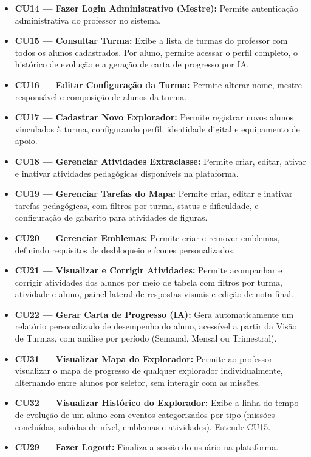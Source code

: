 \documentclass[12pt, a4paper]{article}
\begin{document}
\begin{itemize}
    \item \textbf{CU14 --- Fazer Login Administrativo (Mestre):} Permite autenticação administrativa do professor no sistema.

    \item \textbf{CU15 --- Consultar Turma:} Exibe a lista de turmas do professor com todos os alunos cadastrados. Por aluno, permite acessar o perfil completo, o histórico de evolução e a geração de carta de progresso por IA.

    \item \textbf{CU16 --- Editar Configuração da Turma:} Permite alterar nome, mestre responsável e composição de alunos da turma.

    \item \textbf{CU17 --- Cadastrar Novo Explorador:} Permite registrar novos alunos vinculados à turma, configurando perfil, identidade digital e equipamento de apoio.

    \item \textbf{CU18 --- Gerenciar Atividades Extraclasse:} Permite criar, editar, ativar e inativar atividades pedagógicas disponíveis na plataforma.

    \item \textbf{CU19 --- Gerenciar Tarefas do Mapa:} Permite criar, editar e inativar tarefas pedagógicas, com filtros por turma, status e dificuldade, e configuração de gabarito para atividades de figuras.

    \item \textbf{CU20 --- Gerenciar Emblemas:} Permite criar e remover emblemas, definindo requisitos de desbloqueio e ícones personalizados.

    \item \textbf{CU21 --- Visualizar e Corrigir Atividades:} Permite acompanhar e corrigir atividades dos alunos por meio de tabela com filtros por turma, atividade e aluno, painel lateral de respostas visuais e edição de nota final.

    \item \textbf{CU22 --- Gerar Carta de Progresso (IA):} Gera automaticamente um relatório personalizado de desempenho do aluno, acessível a partir da Visão de Turmas, com análise por período (Semanal, Mensal ou Trimestral).

    \item \textbf{CU31 --- Visualizar Mapa do Explorador:} Permite ao professor visualizar o mapa de progresso de qualquer explorador individualmente, alternando entre alunos por seletor, sem interagir com as missões.

    \item \textbf{CU32 --- Visualizar Histórico do Explorador:} Exibe a linha do tempo de evolução de um aluno com eventos categorizados por tipo (missões concluídas, subidas de nível, emblemas e atividades). Estende CU15.

    \item \textbf{CU29 --- Fazer Logout:} Finaliza a sessão do usuário na plataforma.
\end{itemize}
\end{document}
